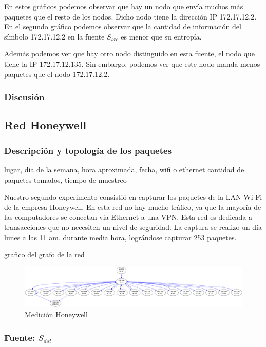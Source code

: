\documentclass[10pt, a4paper]{article}
\begin{document}
En estos gráficos podemos observar que hay un nodo que envía muchos más paquetes que el resto de los nodos. Dicho nodo tiene la dirección IP 172.17.12.2. En el segundo gráfico podemos observar que la cantidad de información del símbolo 172.17.12.2 en la fuente $S_{src}$ es menor que su entropía.

Además podemos ver que hay otro nodo distinguido en esta fuente, el nodo que tiene la IP 172.17.12.135. Sin embargo, podemos ver que este nodo manda menos paquetes que el nodo 172.17.12.2.
 
\subsubsection{Discusión}


\subsection{Red Honeywell}

\subsubsection{Descripción y topología de los paquetes}

lugar, dia de la semana, hora aproximada, fecha, wifi o ethernet
cantidad de paquetes tomados, tiempo de muestreo

Nuestro segundo experimento consistió en capturar los paquetes de la LAN Wi-Fi de la empresa Honeywell. En esta red no hay mucho tráfico, ya que la mayoría de las computadores se conectan via Ethernet a una VPN. Esta red es dedicada a transacciones que no necesiten un nivel de seguridad. La captura se realizo un día lunes a las 11 am. durante media hora, lográndose capturar 253 paquetes.	

grafico del grafo de la red

\begin{figure}[H]
 \begin{center}
  \includegraphics[width=\linewidth]{../imgs/prueba_laburo-ips_red.png}
  \caption{Medición Honeywell}
 \end{center}
\end{figure}


\subsubsection{Fuente: $S_{dst}$}
\end{document}
